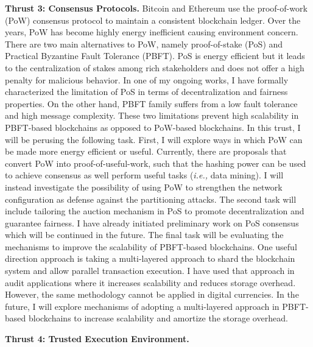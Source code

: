 \documentclass{NSF}
\newcommand{\BfPara}[1]{{\noindent\textbf{#1.}}\xspace}
\begin{document}
\BfPara{Thrust 3: Consensus Protocols} Bitcoin and Ethereum use the proof-of-work (PoW) consensus protocol to maintain a consistent blockchain ledger. Over the years, PoW has become highly energy inefficient causing environment concern. There are two main alternatives to PoW, namely proof-of-stake (PoS) and Practical Byzantine Fault Tolerance (PBFT). PoS is energy efficient but it leads to the centralization of stakes among rich stakeholders and does not offer a high penalty for malicious behavior. In one of my ongoing works, I have formally characterized the limitation of PoS in terms of decentralization and fairness properties. On the other hand, PBFT family suffers from a low fault tolerance and high message complexity. These two limitations prevent high scalability in PBFT-based blockchains as opposed to PoW-based blockchains. In this trust, I will be perusing the following task. First, I will explore ways in which PoW can be made more energy efficient or useful. Currently, there are proposals that convert PoW into proof-of-useful-work, such that the hashing power can be used to achieve consensus as well perform useful tasks ({\em i.e.,} data mining). I will instead investigate the possibility of using PoW to strengthen the network configuration as defense against the partitioning attacks. The second task will include tailoring the auction mechanism in PoS to promote decentralization and guarantee fairness. I have already initiated preliminary work on PoS consensus which will be continued in the future. The final task will be evaluating the mechanisms to improve the scalability of PBFT-based blockchains. One useful direction approach is taking a multi-layered approach to shard the blockchain system and allow parallel transaction execution. I have used that approach in audit applications where it increases scalability and reduces storage overhead. However, the same methodology cannot be applied in digital currencies.  In the future, I will explore mechanisms of adopting a multi-layered approach in PBFT-based blockchains to increase scalability and amortize the storage overhead. 


\BfPara{Thrust 4: Trusted Execution Environment} 
\end{document}
